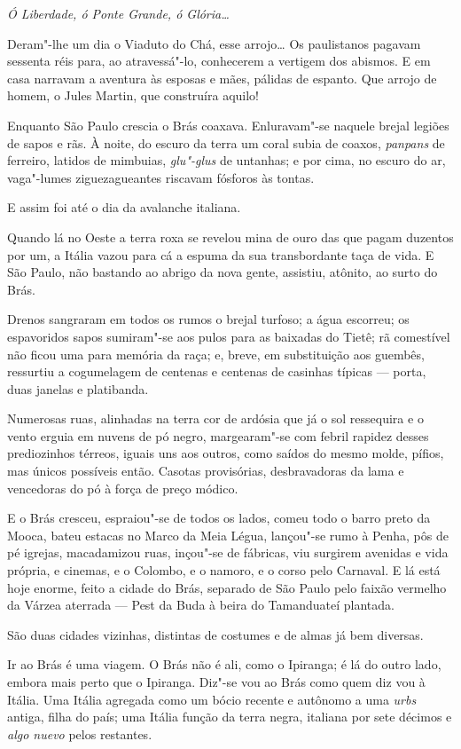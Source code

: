 \emph{Ó Liberdade, ó Ponte Grande, ó Glória\ldots{}}

Deram"-lhe um dia o Viaduto do Chá, esse arrojo\ldots{} Os paulistanos pagavam
sessenta réis para, ao atravessá"-lo, conhecerem a vertigem dos abismos.
E em casa narravam a aventura às esposas e mães, pálidas de espanto. Que
arrojo de homem, o Jules Martin, que construíra aquilo!

Enquanto São Paulo crescia o Brás coaxava. Enluravam"-se naquele brejal
legiões de sapos e rãs. À noite, do escuro da terra um coral subia de
coaxos, \emph{panpans} de ferreiro, latidos de mimbuias, \emph{glu"-glus}
de untanhas; e por cima, no escuro do ar, vaga"-lumes ziguezagueantes
riscavam fósforos às tontas.

E assim foi até o dia da avalanche italiana.

Quando lá no Oeste a terra roxa se revelou mina de ouro das que pagam
duzentos por um, a Itália vazou para cá a espuma da sua transbordante
taça de vida. E São Paulo, não bastando ao abrigo da nova gente,
assistiu, atônito, ao surto do Brás.

Drenos sangraram em todos os rumos o brejal turfoso; a água escorreu; os
espavoridos sapos sumiram"-se aos pulos para as baixadas do Tietê; rã
comestível não ficou uma para memória da raça; e, breve, em substituição
aos guembês, ressurtiu a cogumelagem de centenas e centenas de casinhas
típicas --- porta, duas janelas e platibanda.

Numerosas ruas, alinhadas na terra cor de ardósia que já o sol
ressequira e o vento erguia em nuvens de pó negro, margearam"-se com
febril rapidez desses prediozinhos térreos, iguais uns aos outros, como
saídos do mesmo molde, pífios, mas únicos possíveis então. Casotas
provisórias, desbravadoras da lama e vencedoras do pó à força de preço
módico.

E o Brás cresceu, espraiou"-se de todos os lados, comeu todo o barro
preto da Mooca, bateu estacas no Marco da Meia Légua, lançou"-se rumo à
Penha, pôs de pé igrejas, macadamizou ruas, inçou"-se de fábricas, viu
surgirem avenidas e vida própria, e cinemas, e o Colombo, e o namoro, e
o corso pelo Carnaval. E lá está hoje enorme, feito a cidade do Brás,
separado de São Paulo pelo faixão vermelho da Várzea aterrada --- Pest
da Buda à beira do Tamanduateí plantada.

São duas cidades vizinhas, distintas de costumes e de almas já bem
diversas.

Ir ao Brás é uma viagem. O Brás não é ali, como o Ipiranga; é lá do
outro lado, embora mais perto que o Ipiranga. Diz"-se vou ao Brás como
quem diz vou à Itália. Uma Itália agregada como um bócio recente e
autônomo a uma \emph{urbs} antiga, filha do país; uma Itália função da
terra negra, italiana por sete décimos e \emph{algo nuevo} pelos
restantes.

